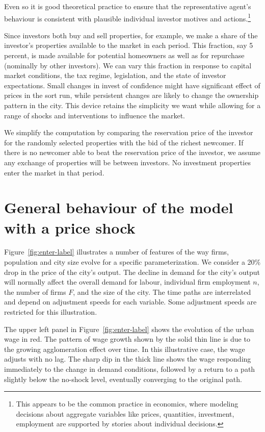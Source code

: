 Even so it is good theoretical practice to ensure that the representative agent's behaviour is consistent with plausible individual investor motives and actions.\footnote{This appears to be the common practice in economics, where modeling decisions about aggregate variables like prices, quantities, investment, employment are supported by stories about individual decisions.} 

Since investors both buy and sell properties, for example, we make a share of the investor's properties available to the market in each period. This fraction, say 5 percent, is made available for potential homeowners as well as for repurchase (nominally by other investors). We can vary this fraction in response to capital market conditions, the tax regime, legislation, and the state of investor expectations. Small changes in invest of confidence might have significant effect of prices in the sort run, while persistent changes are likely to change the ownership pattern in the city. This device retains the simplicity we want while allowing for a range of shocks and interventions to influence the market.

We simplify the computation by comparing the reservation price of the investor for the randomly selected properties with the bid of the richest newcomer. If there is no newcomer able to beat the reservation price of the investor, we assume any exchange of properties will be between investors. No investment properties enter the market in that period. 

\section{General behaviour of the model with a price shock}


Figure~\ref{fig:enter-label} illustrates a number of features of the way firms, population and city size evolve for a specific parameterization. %
We consider a 20\% drop in  the price of the city's output. The decline in demand for the city's output will normally affect the overall demand for labour, individual firm employment $n$, the number of firms $F$, and the size of the city. The time paths are interrelated and depend on adjustment speeds for each variable. Some  adjustment speeds are restricted  for this illustration.

The upper left panel in Figure~\ref{fig:enter-label} shows the evolution of the urban wage  in red. The pattern of wage growth shown by the solid thin line  is due to the growing agglomeration effect over time. In this illustrative case, the wage adjusts with no lag. The sharp dip in the thick  line shows the wage responding immediately to the change in demand conditions, followed by a return to a path slightly below the no-shock level,  eventually converging to the original path. 


